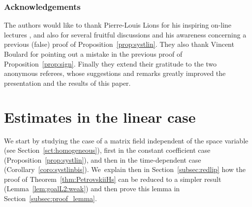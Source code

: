 \documentclass[10pt]{amsart}
\theoremstyle{definition}
\begin{document}
\subsubsection*{Acknowledgements}
The authors would like to thank Pierre-Louis Lions for his inspiring on-line lectures \cite{pilou}, and also for several fruitful discussions and his awareness concerning a previous (false) proof of Proposition~\ref{prop:systlin}. They also thank Vincent Boulard for pointing out a mistake in the previous proof of Proposition~\ref{prop:sign}. Finally they extend their gratitude to the two anonymous referees, whose suggestions and remarks greatly improved the presentation and the results of this paper.

\section{Estimates in the linear case}\label{sec:estimlin}

We start by studying the case of a matrix field independent of the space variable (see Section~\ref{sct:homogeneous}), first in the constant coefficient case (Proposition~\ref{prop:systlin}), and then in the time-dependent case (Corollary~\ref{coro:systlinbis}). We~explain then in Section~\ref{subsec:redlip} how the proof of Theorem~\ref{thm:PetrovskiiHs} can be reduced to a simpler result (Lemma~\ref{lem:goalL2:weak}) and then prove this lemma in Section~\ref{subsec:proof_lemma}.
\end{document}
